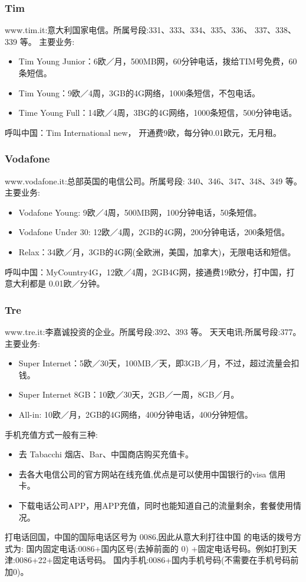 \subsubsection{Tim}
www.tim.it:意大利国家电信。所属号段:331、333、334、335、336、 337、338、339 等。
主要业务:
\begin{itemize}
\item Tim Young Junior：6欧／月，500MB网，60分钟电话，拨给TIM号免费，60条短信。
\item Tim Young：9欧／4周，3GB的4G网络，1000条短信，不包电话。
\item Time Young Full：14欧／4周，3BG的4G网络，1000条短信，500分钟电话。
\end{itemize}
呼叫中国：Tim International new， 开通费9欧，每分钟0.01欧元，无月租。

\subsubsection{Vodafone}
www.vodafone.it:总部英国的电信公司。所属号段: 340、346、347、348、349 等。 
主要业务:
\begin{itemize}
\item Vodafone Young:  9欧／4周，500MB网，100分钟电话，50条短信。
\item Vodafone Under 30:  12欧／4周，2GB的4G网，200分钟电话，200条短信。
\item Relax：34欧／月，3GB的4G网(全欧洲，美国，加拿大)，无限电话和短信。
\end{itemize}
呼叫中国：MyCountry4G，12欧／4周，2GB4G网，接通费19欧分，打中国，打意大利都是 0.01欧／分钟。



\subsubsection{Tre}
www.tre.it:李嘉诚投资的企业。所属号段:392、393 等。 天天电讯:所属号段:377。 
主要业务:
\begin{itemize}
\item  Super Internet：5欧／30天，100MB／天，即3GB／月，不过，超过流量会扣钱。
\item  Super Internet 8GB：10欧／30天，2GB／一周，8GB／月。
\item  All-in: 10欧／月，2GB的4G网络，400分钟电话，400分钟短信。
\end{itemize}


手机充值方式一般有三种:
\begin{itemize}
\item 去 Tabacchi 烟店、Bar、中国商店购买充值卡。 
\item 去各大电信公司的官方网站在线充值,优点是可以使用中国银行的visa 信用卡。 
\item 下载电话公司APP，用APP充值，同时也能知道自己的流量剩余，套餐使用情况。
\end{itemize}
打电话回国，中国的国际电话区号为 0086,因此从意大利打往中国	的电话的拨号方式为: 国内固定电话:0086+国内区号(去掉前面的 0) +固定电话号码。例如打到天津:0086+22+固定电话号码。 国内手机:0086+国内手机号码(不需要在手机号码前加0)。

